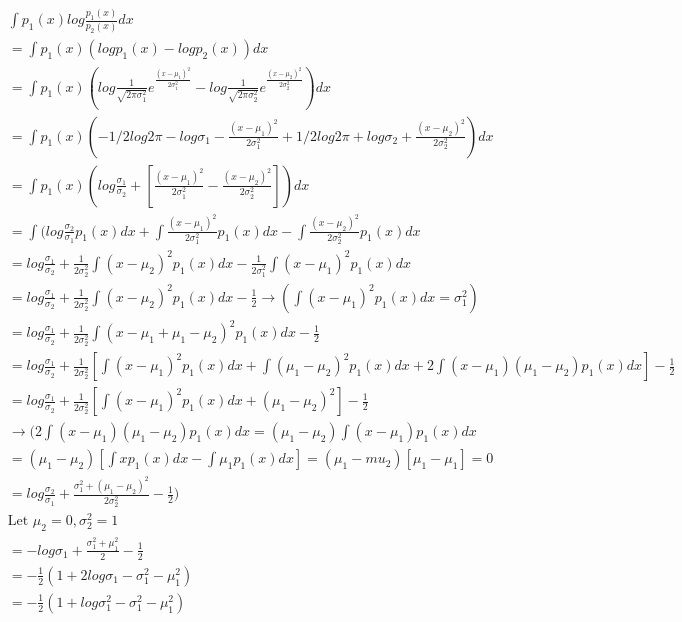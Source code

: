 \documentclass[a4paper]{article}
\begin{document}
\begin{align*}
&\int p_1(x)log\frac{p_1(x)}{p_2(x)} dx\\
&= \int p_1(x) (logp_1(x) - logp_2(x))dx\\
&= \int p_1(x) (log \frac{1}{\sqrt{2\pi\sigma_1^2}}e^{\frac{(x-\mu_1)^2}{2\sigma_1^2}} -log \frac{1}{\sqrt{2\pi\sigma_2^2}}e^{\frac{(x-\mu_2)^2}{2\sigma_2^2}})dx\\
&= \int p_1(x) (-1/2 log2\pi - log\sigma_1 - \frac{(x-\mu_1)^2}{2\sigma_1^2} + 1/2 log2\pi + log \sigma_2 + \frac{(x-\mu_2)^2}{2\sigma_2^2})dx\\
&= \int p_1(x)(log\frac{\sigma_1}{\sigma_2} + [\frac{(x-\mu_1)^2}{2\sigma_1^2} - \frac{(x-\mu_2)^2}{2\sigma_2^2}]) dx\\
&= \int (log\frac{\sigma_2}{\sigma_1}p_1(x)dx + \int \frac{(x-\mu_1)^2}{2\sigma_1^2} p_1(x)dx - \int \frac{(x-\mu_2)^2}{2\sigma_2^2} p_1(x) dx\\
&= log\frac{\sigma_1}{\sigma_2} + \frac{1}{2\sigma_2^2}\int (x-\mu_2)^2p_1(x)dx - \frac{1}{2\sigma_1^2}\int (x-\mu_1)^2 p_1(x)dx\\
&= log\frac{\sigma_1}{\sigma_2} + \frac{1}{2\sigma_2^2}\int (x-\mu_2)^2p_1(x)dx - \frac{1}{2} \to (\int (x-\mu_1)^2 p_1(x)dx=\sigma_1^2)\\
&= log\frac{\sigma_1}{\sigma_2} + \frac{1}{2\sigma_2^2}\int (x-\mu_1+\mu_1-\mu_2)^2p_1(x)dx - \frac{1}{2}\\
&= log\frac{\sigma_1}{\sigma_2} + \frac{1}{2\sigma_2^2}[\int (x-\mu_1)^2p_1(x)dx + \int (\mu_1-\mu_2)^2p_1(x)dx + 2\int(x-\mu_1)(\mu_1-\mu_2)p_1(x)dx] - \frac{1}{2}\\
&=log\frac{\sigma_1}{\sigma_2} + \frac{1}{2\sigma_2^2}[\int (x-\mu_1)^2p_1(x)dx +(\mu_1-\mu_2)^2] - \frac{1}{2}\\
&\to (2\int(x-\mu_1)(\mu_1-\mu_2)p_1(x)dx = (\mu_1-\mu_2)\int (x-\mu_1)p_1(x)dx \\
&= (\mu_1-\mu_2)[\int xp_1(x)dx - \int \mu_1p_1(x)dx] = (\mu_1-mu_2)[\mu_1-\mu_1]=0\\
&= log\frac{\sigma_2}{\sigma_1}+\frac{\sigma_1^2+(\mu_1-\mu_2)^2}{2\sigma_2^2} - \frac{1}{2})\\
&\text{Let }\mu_2 = 0, \sigma_2^2 = 1\\
&= -log \sigma_1 + \frac{\sigma_1^2+\mu_1^2}{2}-\frac{1}{2}\\
&= -\frac{1}{2}(1 + 2log \sigma_1 - \sigma_1^2-\mu_1^2)\\
&= -\frac{1}{2}(1 + log \sigma_1^2 - \sigma_1^2-\mu_1^2)
\end{align*}
\end{document}
